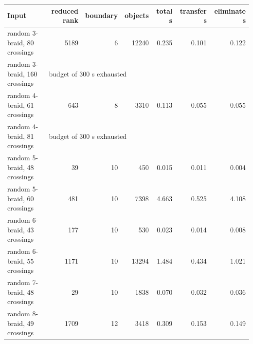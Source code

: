 \begin{tabular}{@{}lrrrrrr@{}}
\toprule
Input & reduced rank & boundary & objects & total s & transfer s & eliminate s \\
\midrule
random 3-braid, 80 crossings & 5189 & 6 & 12240 & 0.235 & 0.101 & 0.122 \\
random 3-braid, 160 crossings & \multicolumn{6}{l}{budget of 300 s exhausted} \\
random 4-braid, 61 crossings & 643 & 8 & 3310 & 0.113 & 0.055 & 0.055 \\
random 4-braid, 81 crossings & \multicolumn{6}{l}{budget of 300 s exhausted} \\
random 5-braid, 48 crossings & 39 & 10 & 450 & 0.015 & 0.011 & 0.004 \\
random 5-braid, 60 crossings & 481 & 10 & 7398 & 4.663 & 0.525 & 4.108 \\
random 6-braid, 43 crossings & 177 & 10 & 530 & 0.023 & 0.014 & 0.008 \\
random 6-braid, 55 crossings & 1171 & 10 & 13294 & 1.484 & 0.434 & 1.021 \\
random 7-braid, 48 crossings & 29 & 10 & 1838 & 0.070 & 0.032 & 0.036 \\
random 8-braid, 49 crossings & 1709 & 12 & 3418 & 0.309 & 0.153 & 0.149 \\
\bottomrule
\end{tabular}
